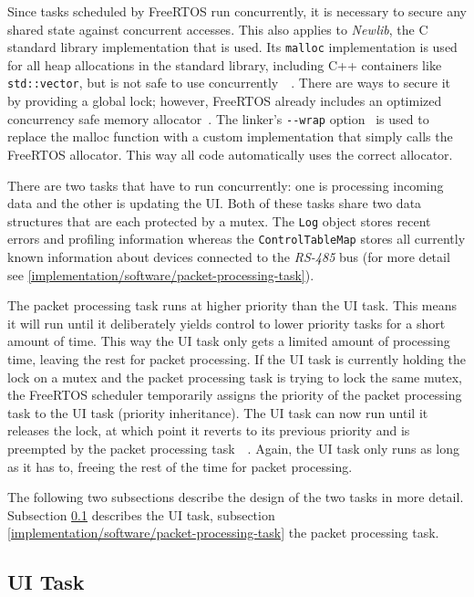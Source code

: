 Since tasks scheduled by FreeRTOS run concurrently, it is necessary to secure any shared state against
concurrent accesses. This also applies to \textit{Newlib}, the C standard library implementation
that is used. Its \lstinline{malloc} implementation is used for all heap allocations in the standard
library, including C++ containers like \mbox{\lstinline{std::vector},} but is not safe to use concurrently~\
\cite{newlib-malloc-lock}. There are ways to secure it by providing a global lock; however, FreeRTOS
already includes an optimized concurrency safe memory allocator~\cite{freertos-allocators}. The linker's
\lstinline{--wrap} option~\cite{arm-none-eabi-ld-manpage} is used to replace the malloc function with
a custom implementation that simply calls the FreeRTOS allocator. This way all code automatically
uses the correct allocator.

There are two tasks that have to run concurrently: one is processing incoming data and the other is
updating the UI. Both of these tasks share two data structures that are each protected by a mutex.
The \lstinline{Log} object stores recent errors and profiling information whereas the
\lstinline{ControlTableMap} stores all currently known information about devices connected to the
\textit{RS-485} bus (for more detail see \ref{implementation/software/packet-processing-task}).

The packet processing task runs at higher priority than the UI task. This means it will run until
it deliberately yields control to lower priority tasks for a short amount of time. This way the UI
task only gets a limited amount of processing time, leaving the rest for packet processing. If the
UI task is currently holding the lock on a mutex and the packet processing task is trying to lock the
same mutex, the FreeRTOS scheduler temporarily assigns the priority of the packet processing task
to the UI task (priority inheritance). The UI task can now run until it releases the lock, at which
point it reverts to its previous priority and is preempted by the packet processing task~\
\cite{freertos-create-mutex-docs}. Again, the UI task only runs as long as it has to, freeing the
rest of the time for packet processing.

The following two subsections describe the design of the two tasks in more detail. Subsection
\ref{implementation/software/ui-task} describes the UI task, subsection
\ref{implementation/software/packet-processing-task} the packet processing task.

\subsection{UI Task}
\label{implementation/software/ui-task}

